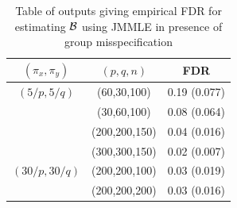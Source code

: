 \begin{scriptsize}
\begin{table}[t!]
\centering
    \begin{tabular}{ccc}
    \hline
    $(\pi_x, \pi_y)$ & $(p,q,n)$   & FDR          \\\hline
    $(5/p, 5/q)$   & (60,30,100)   & 0.19 (0.077) \\
    ~              & (30,60,100)   & 0.08 (0.064) \\
    ~              & (200,200,150) & 0.04 (0.016) \\
    ~              & (300,300,150) & 0.02 (0.007) \\\hline
    $(30/p, 30/q)$ & (200,200,100) & 0.03 (0.019) \\
    ~              & (200,200,200) & 0.03 (0.016) \\\hline
    \end{tabular}
    \caption{Table of outputs giving empirical FDR for estimating ${\cal{B}}$ using JMMLE in presence of group misspecification}
    \label{table:simtable22}
\end{table}
\end{scriptsize}

